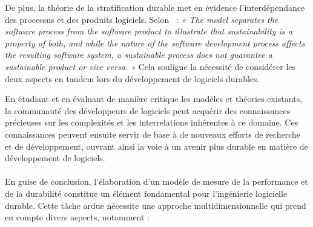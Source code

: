 De plus, la théorie de la stratification durable met en évidence l'interdépendance des processus et des produits logiciels. Selon~\cite{SustainableStratifiedTheory} : \emph{« The model separates the software process from the software product to illustrate that sustainability is a property of both, and while the nature of the software development process affects the resulting software system, a sustainable process does not guarantee a sustainable product or vice versa. »} Cela souligne la nécessité de considérer les deux aspects en tandem lors du développement de logiciels durables.


En étudiant et en évaluant de manière critique les modèles et théories existants, la communauté des développeurs de logiciels peut acquérir des connaissances précieuses sur les complexités et les interrelations inhérentes à ce domaine. Ces connaissances peuvent ensuite servir de base à de nouveaux efforts de recherche et de développement, ouvrant ainsi la voie à un avenir plus durable en matière de développement de logiciels.


\paragraph{}
En guise de conclusion, l'élaboration d'un modèle de mesure de la performance et de la durabilité constitue un élément fondamental pour l'ingénierie logicielle durable. Cette tâche ardue nécessite une approche multidimensionnelle qui prend en compte divers aspects, notamment :

